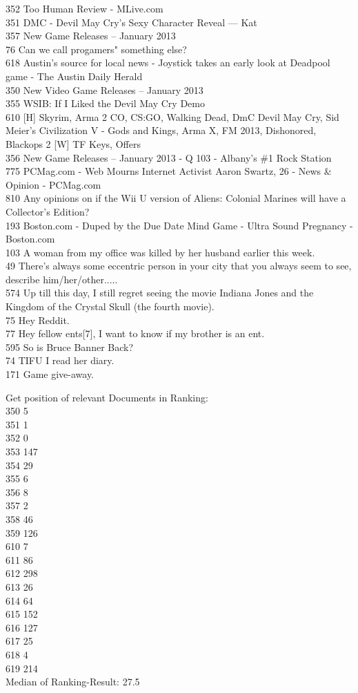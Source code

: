 \documentclass[11pt]{article}
\begin{document}
352 Too Human Review - MLive.com\\
351 DMC - Devil May Cry's Sexy Character Reveal --- Kat\\
357 New Game Releases -- January 2013\\
76 Can we call progamers" something else?\\
618 Austin's source for local news - Joystick takes an early look at
Deadpool game - The Austin Daily Herald\\
350 New Video Game Releases -- January 2013\\
355 WSIB: If I Liked the Devil May Cry Demo\\
610 {[}H{]} Skyrim, Arma 2 CO, CS:GO, Walking Dead, DmC Devil May Cry,
Sid Meier's Civilization V - Gods and Kings, Arma X, FM 2013,
Dishonored, Blackops 2 {[}W{]} TF Keys, Offers\\
356 New Game Releases -- January 2013 - Q 103 - Albany's \#1 Rock
Station\\
775 PCMag.com - Web Mourns Internet Activist Aaron Swartz, 26 - News \&
Opinion - PCMag.com\\
810 Any opinions on if the Wii U version of Aliens: Colonial Marines
will have a Collector's Edition?\\
193 Boston.com - Duped by the Due Date Mind Game - Ultra Sound Pregnancy
- Boston.com\\
103 A woman from my office was killed by her husband earlier this
week.\\
49 There's always some eccentric person in your city that you always
seem to see, describe him/her/other.....\\
574 Up till this day, I still regret seeing the movie Indiana Jones and
the Kingdom of the Crystal Skull (the fourth movie).\\
75 Hey Reddit.\\
77 Hey fellow ents{[}7{]}, I want to know if my brother is an ent.\\
595 So is Bruce Banner Back?\\
74 TIFU I read her diary.\\
171 Game give-away.

    Get position of relevant Documents in Ranking:\\
350 5\\
351 1\\
352 0\\
353 147\\
354 29\\
355 6\\
356 8\\
357 2\\
358 46\\
359 126\\
610 7\\
611 86\\
612 298\\
613 26\\
614 64\\
615 152\\
616 127\\
617 25\\
618 4\\
619 214\\
Median of Ranking-Result: 27.5
\end{document}
